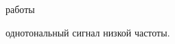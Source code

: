 \documentclass[a4paper,12pt]{article}
\begin{document}
{ работы}
\begin{enumerate}
{ однотональный сигнал низкой частоты.
\\}


\end{enumerate}
\end{document}
